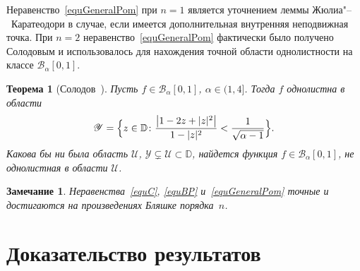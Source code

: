 \documentclass{article}
\theoremstyle{definition}
\theoremstyle{plain}
\newtheorem{remark}{Замечание}
\newtheorem{OldTheorem}{Теорема}
\begin{document}
Неравенство~\eqref{equGeneralPom} при $n=1$ является уточнением леммы Жюлиа"--~Каратеодори в случае, если имеется дополнительная внутренняя неподвижная точка. При $n=2$ неравенство~\eqref{equGeneralPom} фактически было получено Солодовым и использовалось для нахождения точной области однолистности на классе $\mathscr B_{\alpha}[0, 1]$.
\begin{OldTheorem}[Солодов~\cite{Sol2021}]\label{thSol}
	Пусть $f\in \mathscr B_{\alpha}[0, 1]$, $\alpha\in (1,4]$.  Тогда $f$ однолистна в области
	\begin{equation*}
		\mathscr Y=	\Bigl\{z\in \mathbb D\colon
		\frac	{\bigl|1-2z+|z|^2\bigr|}{1-|z|^2}<\frac{1}{\sqrt{\alpha-1}}
		\Bigr\}.
	\end{equation*}
	Какова бы ни была область $\mathscr{U}$,  $\mathscr Y\varsubsetneq\mathscr{U}\subset\mathbb D$, найдется функция $f\in \mathscr B_{\alpha}[0, 1]$, не однолистная в области $\mathscr{U}$.
\end{OldTheorem}
\begin{remark}
	Неравенства~\eqref{equC}, \eqref{equBP} и~\eqref{equGeneralPom} точные и достигаются на произведениях Бляшке порядка~$n$.	
\end{remark}

\section*{Доказательство результатов}
\end{document}
